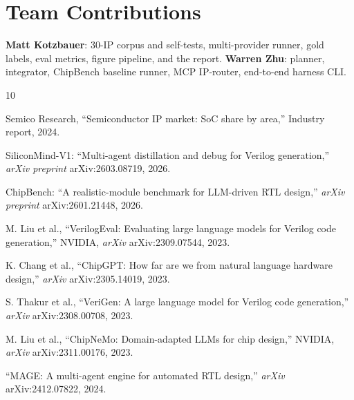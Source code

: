 \documentclass[conference]{IEEEtran}
\begin{document}
\section*{Team Contributions}

\textbf{Matt Kotzbauer}: 30-IP corpus and self-tests, multi-provider runner, gold labels, eval metrics, figure pipeline, and the report. \textbf{Warren Zhu}: planner, integrator, ChipBench baseline runner, MCP IP-router, end-to-end harness CLI. 


\begin{thebibliography}{10}

Semico Research, ``Semiconductor IP market: SoC share by area,'' Industry report, 2024.

{SiliconMind-V1}: ``Multi-agent distillation and debug for Verilog generation,''
\emph{arXiv preprint} arXiv:2603.08719, 2026.

{ChipBench}: ``A realistic-module benchmark for LLM-driven RTL design,''
\emph{arXiv preprint} arXiv:2601.21448, 2026.

M. Liu et al., ``VerilogEval: Evaluating large language models for Verilog code generation,''
NVIDIA, \emph{arXiv} arXiv:2309.07544, 2023.

K. Chang et al., ``ChipGPT: How far are we from natural language hardware design,''
\emph{arXiv} arXiv:2305.14019, 2023.

S. Thakur et al., ``VeriGen: A large language model for Verilog code generation,''
\emph{arXiv} arXiv:2308.00708, 2023.

M. Liu et al., ``ChipNeMo: Domain-adapted LLMs for chip design,''
NVIDIA, \emph{arXiv} arXiv:2311.00176, 2023.

``MAGE: A multi-agent engine for automated RTL design,''
\emph{arXiv} arXiv:2412.07822, 2024.

\end{thebibliography}
\end{document}
